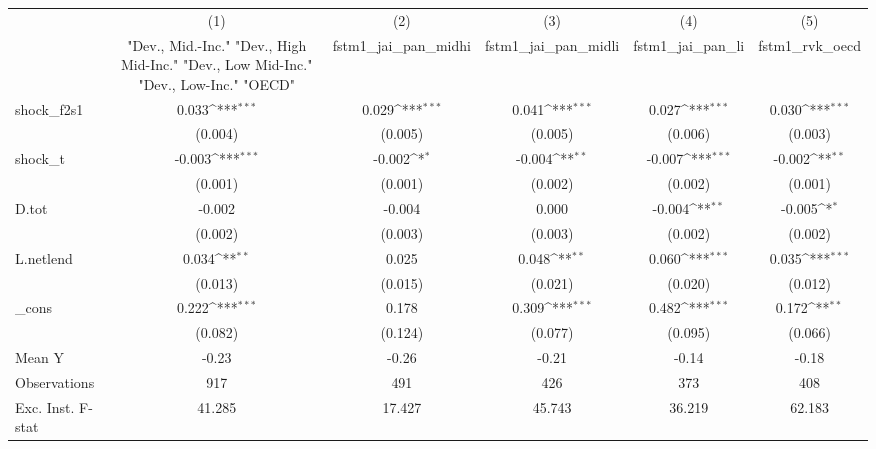 {
\def\sym#1{\ifmmode^{#1}\else\(^{#1}\)\fi}
\begin{tabular}{l*{5}{c}}
\toprule
            &\multicolumn{1}{c}{(1)}&\multicolumn{1}{c}{(2)}&\multicolumn{1}{c}{(3)}&\multicolumn{1}{c}{(4)}&\multicolumn{1}{c}{(5)}\\
            &\multicolumn{1}{c}{ "Dev., Mid.-Inc." "Dev., High Mid-Inc." "Dev., Low Mid-Inc." "Dev., Low-Inc." "OECD" }&\multicolumn{1}{c}{fstm1\_jai\_pan\_midhi}&\multicolumn{1}{c}{fstm1\_jai\_pan\_midli}&\multicolumn{1}{c}{fstm1\_jai\_pan\_li}&\multicolumn{1}{c}{fstm1\_rvk\_oecd}\\
\midrule
shock\_f2s1  &       0.033\sym{***}&       0.029\sym{***}&       0.041\sym{***}&       0.027\sym{***}&       0.030\sym{***}\\
            &     (0.004)         &     (0.005)         &     (0.005)         &     (0.006)         &     (0.003)         \\
\addlinespace
shock\_t     &      -0.003\sym{***}&      -0.002\sym{*}  &      -0.004\sym{**} &      -0.007\sym{***}&      -0.002\sym{**} \\
            &     (0.001)         &     (0.001)         &     (0.002)         &     (0.002)         &     (0.001)         \\
\addlinespace
D.tot       &      -0.002         &      -0.004         &       0.000         &      -0.004\sym{**} &      -0.005\sym{*}  \\
            &     (0.002)         &     (0.003)         &     (0.003)         &     (0.002)         &     (0.002)         \\
\addlinespace
L.netlend   &       0.034\sym{**} &       0.025         &       0.048\sym{**} &       0.060\sym{***}&       0.035\sym{***}\\
            &     (0.013)         &     (0.015)         &     (0.021)         &     (0.020)         &     (0.012)         \\
\addlinespace
\_cons      &       0.222\sym{***}&       0.178         &       0.309\sym{***}&       0.482\sym{***}&       0.172\sym{**} \\
            &     (0.082)         &     (0.124)         &     (0.077)         &     (0.095)         &     (0.066)         \\
\midrule
Mean Y      &       -0.23         &       -0.26         &       -0.21         &       -0.14         &       -0.18         \\
Observations&         917         &         491         &         426         &         373         &         408         \\
Exc. Inst. F-stat&      41.285         &      17.427         &      45.743         &      36.219         &      62.183         \\
\bottomrule
\end{tabular}
}
